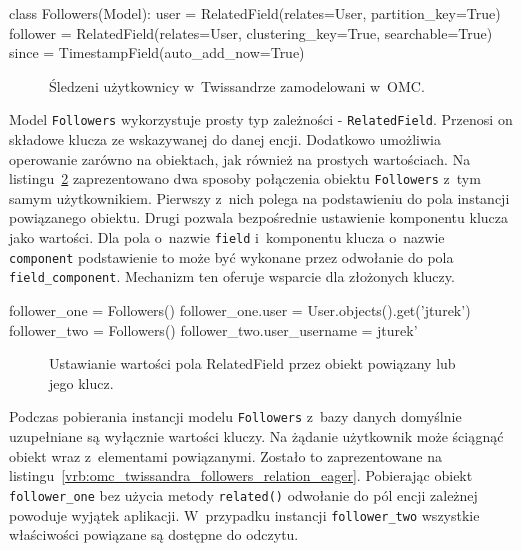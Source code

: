 \begin{verbbox}
	class Followers(Model):
	    user = RelatedField(relates=User, 
	                        partition_key=True)
	    follower = RelatedField(relates=User,
	                            clustering_key=True,
	                            searchable=True)
	    since = TimestampField(auto_add_now=True)
\end{verbbox}

\begin{figure}[ht!]
	\centering
	\theverbbox
	\caption{Śledzeni użytkownicy w~Twissandrze zamodelowani w~OMC.}
	\label{vrb:omc_twissandra_followers}
\end{figure}

Model \verb+Followers+ wykorzystuje prosty typ zależności - \verb+RelatedField+. Przenosi on składowe klucza ze wskazywanej do danej encji. Dodatkowo umożliwia operowanie zarówno na obiektach, jak również na prostych wartościach. Na listingu~\ref{vrb:omc_twissandra_followers_relation} zaprezentowano dwa sposoby połączenia obiektu \verb+Followers+ z~tym samym użytkownikiem. Pierwszy z~nich polega na podstawieniu do pola instancji powiązanego obiektu. Drugi pozwala bezpośrednie ustawienie komponentu klucza jako wartości. Dla pola o~nazwie \verb+field+ i~komponentu klucza o~nazwie \verb+component+ podstawienie to może być wykonane przez odwołanie do pola \verb+field_component+. Mechanizm ten oferuje wsparcie dla złożonych kluczy.

\begin{verbbox}
	follower_one = Followers()
	follower_one.user = User.objects().get('jturek')
	follower_two = Followers()
	follower_two.user_username = jturek'
\end{verbbox}

\begin{figure}[ht!]
	\centering
	\theverbbox
	\caption{Ustawianie wartości pola RelatedField przez obiekt powiązany lub jego klucz.}
	\label{vrb:omc_twissandra_followers_relation}
\end{figure}

Podczas pobierania instancji modelu \verb+Followers+ z~bazy danych domyślnie uzupełniane są wyłącznie wartości kluczy. Na żądanie użytkownik może ściągnąć obiekt wraz z~elementami powiązanymi. Zostało to zaprezentowane na listingu~\ref{vrb:omc_twissandra_followers_relation_eager}. Pobierając obiekt \verb+follower_one+ bez użycia metody \verb+related()+ odwołanie do pól encji zależnej powoduje wyjątek aplikacji. W~przypadku instancji \verb+follower_two+ wszystkie właściwości powiązane są dostępne do odczytu.

